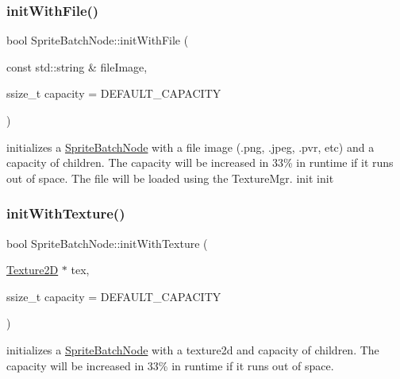 \subsubsection{\texorpdfstring{init\+With\+File()}{initWithFile()}\hspace{0.1cm}{\footnotesize\ttfamily [2/2]}}
{\footnotesize\ttfamily bool Sprite\+Batch\+Node\+::init\+With\+File (\begin{DoxyParamCaption}\item[{const std\+::string \&}]{file\+Image,  }\item[{ssize\+\_\+t}]{capacity = {\ttfamily DEFAULT\+\_\+CAPACITY} }\end{DoxyParamCaption})}

initializes a \hyperlink{classSpriteBatchNode}{Sprite\+Batch\+Node} with a file image (.png, .jpeg, .pvr, etc) and a capacity of children. The capacity will be increased in 33\% in runtime if it runs out of space. The file will be loaded using the Texture\+Mgr.  init  init \mbox{\label{classSpriteBatchNode_aeec99ca2f5e03b80fb8d1f81bbc5034a}} 
\subsubsection{\texorpdfstring{init\+With\+Texture()}{initWithTexture()}\hspace{0.1cm}{\footnotesize\ttfamily [1/2]}}
{\footnotesize\ttfamily bool Sprite\+Batch\+Node\+::init\+With\+Texture (\begin{DoxyParamCaption}\item[{\hyperlink{classTexture2D}{Texture2D} $\ast$}]{tex,  }\item[{ssize\+\_\+t}]{capacity = {\ttfamily DEFAULT\+\_\+CAPACITY} }\end{DoxyParamCaption})}

initializes a \hyperlink{classSpriteBatchNode}{Sprite\+Batch\+Node} with a texture2d and capacity of children. The capacity will be increased in 33\% in runtime if it runs out of space. \mbox{\label{classSpriteBatchNode_aeec99ca2f5e03b80fb8d1f81bbc5034a}} 
